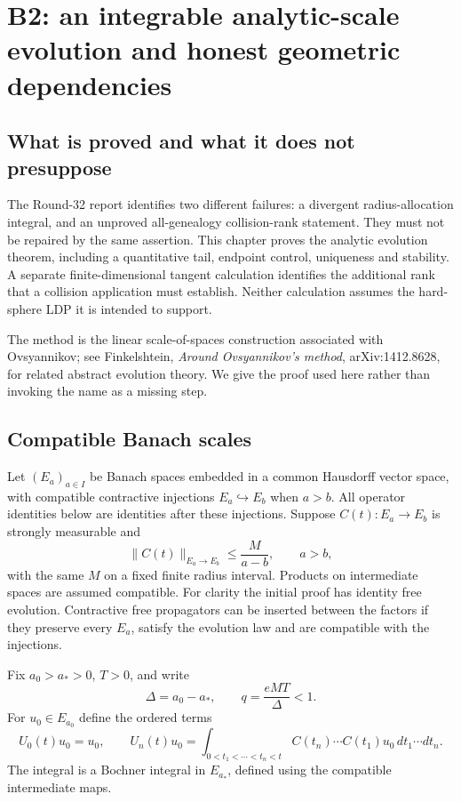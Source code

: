 \section{B2: an integrable analytic-scale evolution and honest geometric dependencies}
\label{sec:r33-b2}

\subsection{What is proved and what it does not presuppose}
The Round-32 report identifies two different failures: a divergent radius-allocation integral, and an unproved all-genealogy collision-rank statement. They must not be repaired by the same assertion. This chapter proves the analytic evolution theorem, including a quantitative tail, endpoint control, uniqueness and stability. A separate finite-dimensional tangent calculation identifies the additional rank that a collision application must establish. Neither calculation assumes the hard-sphere LDP it is intended to support.

The method is the linear scale-of-spaces construction associated with Ovsyannikov; see Finkelshtein, \emph{Around Ovsyannikov's method}, arXiv:1412.8628, for related abstract evolution theory. We give the proof used here rather than invoking the name as a missing step.

\subsection{Compatible Banach scales}
Let $(E_a)_{a\in I}$ be Banach spaces embedded in a common Hausdorff vector space, with compatible contractive injections $E_a\hookrightarrow E_b$ when $a>b$. All operator identities below are identities after these injections. Suppose $C(t):E_a\to E_b$ is strongly measurable and
\begin{equation}\label{eq:r33-b2-cauchy}
 \|C(t)\|_{E_a\to E_b}\le \frac{M}{a-b},\qquad a>b,
\end{equation}
with the same $M$ on a fixed finite radius interval. Products on intermediate spaces are assumed compatible. For clarity the initial proof has identity free evolution. Contractive free propagators can be inserted between the factors if they preserve every $E_a$, satisfy the evolution law and are compatible with the injections.

Fix $a_0>a_*>0$, $T>0$, and write
\[
 \Delta=a_0-a_*,\qquad q=\frac{eMT}{\Delta}<1.
\]
For $u_0\in E_{a_0}$ define the ordered terms
\[
 U_0(t)u_0=u_0,\qquad
 U_n(t)u_0=\int_{0<t_1<\cdots<t_n<t}
 C(t_n)\cdots C(t_1)u_0\,dt_1\cdots dt_n.
\]
The integral is a Bochner integral in $E_{a_*}$, defined using the compatible intermediate maps.

